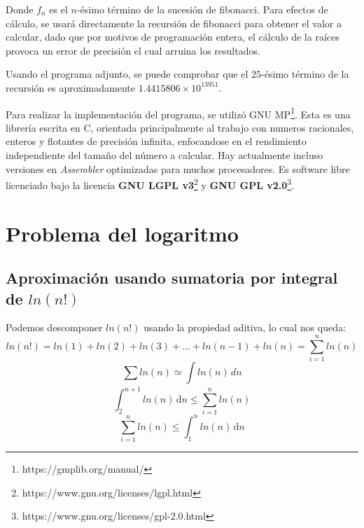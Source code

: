 \documentclass[11pt]{utalcaDoc}
\numberwithin{equation}{section}
\begin{document}
Donde $f_n$ es el $n$-ésimo término de la sucesión de fibonacci. Para efectos de cálculo, se usará directamente la recursión de fibonacci para obtener el valor a calcular, dado que por motivos de programación entera, el cálculo de la raíces provoca un error de precisión el cual arruina los resultados.

Usando el programa adjunto, se puede comprobar que el $25$-ésimo término de la recursión es aproximadamente $1.4415806\times10^{13951}$.

Para realizar la implementación del programa, se utilizó GNU MP\footnote{https://gmplib.org/manual/}. Esta es una librería escrita en C, orientada principalmente al trabajo con numeros racionales, enteros y flotantes de precisión infinita, enfocandose en el rendimiento independiente del tamaño del número a calcular. Hay actualmente incluso versiones en \textit{Assembler} optimizadas para muchos procesadores. Es software libre licenciado bajo la licencia \textbf{GNU LGPL v3}\footnote{https://www.gnu.org/licenses/lgpl.html} y \textbf{GNU GPL v2.0}\footnote{https://www.gnu.org/licenses/gpl-2.0.html}.

	\newpage

\section{Problema del logaritmo}
\subsection{Aproximación usando sumatoria por integral de $ln(n!)$}

Podemos descomponer $ln(n!)$ usando la propiedad aditiva, lo cual nos queda:
\begin{equation}
	ln(n!) = ln(1) + ln(2) + ln(3) + \ldots + ln(n-1) + ln(n) 
	=
	\sum_{i=1}^{n}ln(n)
\end{equation}\label{EQ:LOGARITMO_ADITIVA}
\begin{equation}\label{EQ:INTEGRAL_SUMATORIA}
	\sum_{}^{}ln(n) \simeq \int ln(n)\,dn
\end{equation}
\begin{equation}\label{EQ:LOGARITMO_COTA_INFERIOR_1}
	\int_{2}^{n+1} \! ln(n) \, \mathrm{d}n 
	\leq
	\sum_{i=1}^{n}ln(n)
\end{equation}
\begin{equation}\label{EQ:LOGARITMO_COTA_SUPERIOR_2}
	\sum_{i=1}^{n}ln(n)
	\leq
	\int_{1}^{n} \! ln(n) \, \mathrm{d}n 
\end{equation}
\end{document}
